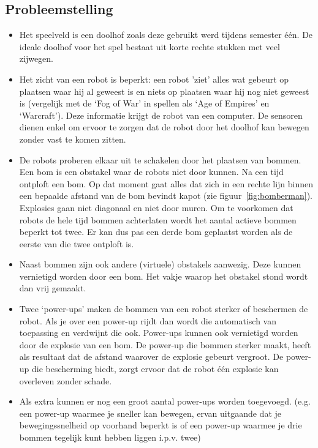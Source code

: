 \documentclass[eind]{penoverslag}
\begin{document}
\subsection{Probleemstelling}
\begin{itemize}
\item
Het speelveld is een doolhof zoals deze gebruikt werd tijdens semester \'e\'en. De ideale doolhof voor het spel bestaat uit korte rechte stukken met veel zijwegen.

\item
Het zicht van een robot is beperkt: een robot 'ziet' alles wat gebeurt op plaatsen waar hij al geweest is en niets op plaatsen waar hij nog niet geweest is (vergelijk met de `Fog of War' in spellen als `Age of Empires' en `Warcraft'). Deze informatie krijgt de robot van een computer. De sensoren dienen enkel om ervoor te zorgen dat de robot door het doolhof kan bewegen zonder vast te komen zitten.

\item
De robots proberen elkaar uit te schakelen door het plaatsen van bommen. Een bom is een obstakel waar de robots niet door kunnen. Na een tijd ontploft een bom. Op dat moment gaat alles dat zich in een rechte lijn binnen een bepaalde afstand van de bom bevindt kapot (zie figuur~\ref{fig:bomberman}). Explosies gaan niet diagonaal en niet door muren. Om te voorkomen dat robots de hele tijd bommen achterlaten wordt het aantal actieve bommen beperkt tot twee. Er kan dus pas een derde bom geplaatst worden als de eerste van die twee ontploft is.

\item
Naast bommen zijn ook andere (virtuele) obstakels aanwezig. Deze kunnen vernietigd worden door een bom. Het vakje waarop het obstakel stond wordt dan vrij gemaakt.

\item
Twee `power-ups' maken de bommen van een robot sterker of beschermen de robot. Als je over een power-up rijdt dan wordt die automatisch van toepassing en verdwijnt die ook. Power-ups kunnen ook vernietigd worden door de explosie van een bom. De power-up die bommen sterker maakt, heeft als resultaat dat de afstand waarover de explosie gebeurt vergroot. De power-up die bescherming biedt, zorgt ervoor dat de robot \'e\'en explosie kan overleven zonder schade.

\item
Als extra kunnen er nog een groot aantal power-ups worden toegevoegd. (e.g. een power-up waarmee je sneller kan bewegen, ervan uitgaande dat je bewegingssnelheid op voorhand beperkt is of een power-up waarmee je drie bommen tegelijk kunt hebben liggen i.p.v. twee)
\end{itemize}
\end{document}
